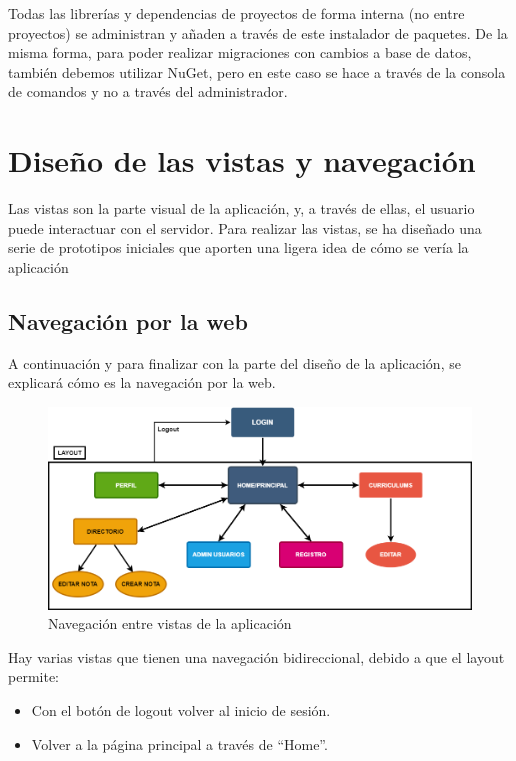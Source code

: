 Todas las librerías y dependencias de proyectos de forma interna (no entre proyectos) se administran y añaden a través de este instalador de paquetes. De la misma forma, para poder realizar migraciones con cambios a base de datos, también debemos utilizar NuGet, pero en este caso se hace a través de la consola de comandos y no a través del administrador.

\section{Diseño de las vistas y navegación}
Las vistas son la parte visual de la aplicación, y, a través de ellas, el usuario puede interactuar con el servidor. Para realizar las vistas, se ha diseñado una serie de prototipos iniciales que aporten una ligera idea de cómo se vería la aplicación

\subsection{Navegación por la web}
A continuación y para finalizar con la parte del diseño de la aplicación, se explicará cómo es la navegación por la web.
\begin{figure}[H]
    \centering
    \includegraphics[width=\linewidth]{img/FlujoNavegacion.png}
    \caption{Navegación entre vistas de la aplicación}
\end{figure}


Hay varias vistas que tienen una navegación bidireccional, debido a que el layout permite:
\begin{itemize}
\tightlist
    \item Con el botón de logout volver al inicio de sesión.
    \item Volver a la página principal a través de ``Home''.
\end{itemize}


